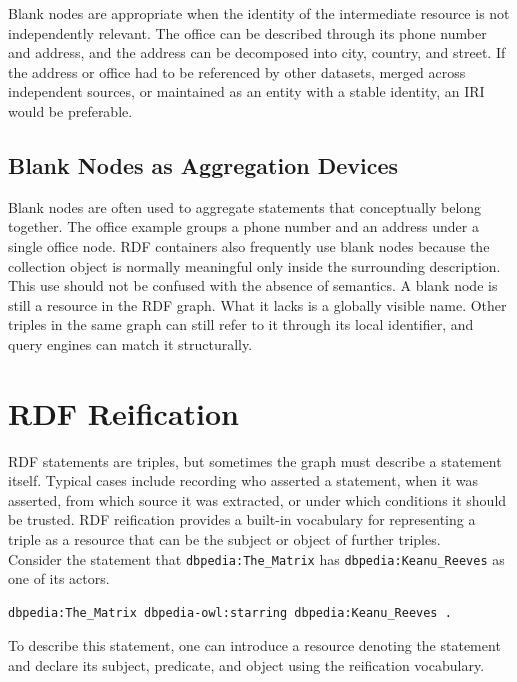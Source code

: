 \documentclass{scrbook}
\begin{document}
	Blank nodes are appropriate when the identity of the intermediate resource is not independently relevant. The office can be described through its phone number and address, and the address can be decomposed into city, country, and street. If the address or office had to be referenced by other datasets, merged across independent sources, or maintained as an entity with a stable identity, an IRI would be preferable.
	
	\subsection{Blank Nodes as Aggregation Devices}
	
	Blank nodes are often used to aggregate statements that conceptually belong together. The office example groups a phone number and an address under a single office node. RDF containers also frequently use blank nodes because the collection object is normally meaningful only inside the surrounding description.\\
	
	This use should not be confused with the absence of semantics. A blank node is still a resource in the RDF graph. What it lacks is a globally visible name. Other triples in the same graph can still refer to it through its local identifier, and query engines can match it structurally.
	
	\section{RDF Reification}
	
	RDF statements are triples, but sometimes the graph must describe a statement itself. Typical cases include recording who asserted a statement, when it was asserted, from which source it was extracted, or under which conditions it should be trusted. RDF reification provides a built-in vocabulary for representing a triple as a resource that can be the subject or object of further triples.\\
	
	Consider the statement that \texttt{dbpedia:The\_Matrix} has \texttt{dbpedia:Keanu\_Reeves} as one of its actors.
	
	\begin{lstlisting}
dbpedia:The_Matrix dbpedia-owl:starring dbpedia:Keanu_Reeves .
	\end{lstlisting}
	
	To describe this statement, one can introduce a resource denoting the statement and declare its subject, predicate, and object using the reification vocabulary.
	
\end{document}

